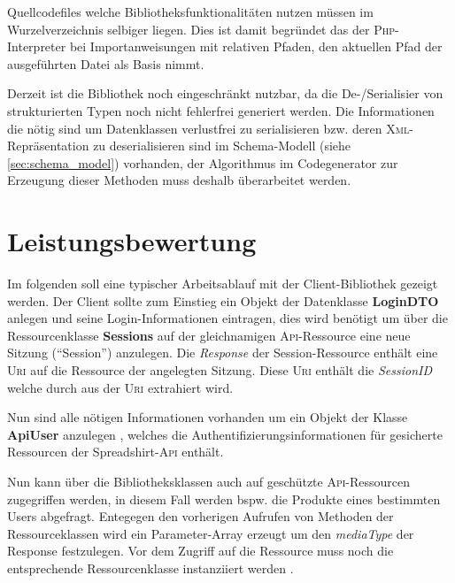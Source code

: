 Quellcodefiles welche Bibliotheksfunktionalitäten nutzen müssen im Wurzelverzeichnis selbiger liegen. Dies ist damit begründet das der \textsc{Php}-Interpreter bei Importanweisungen mit relativen Pfaden, den aktuellen Pfad der ausgeführten Datei als Basis nimmt.

Derzeit ist die Bibliothek noch eingeschränkt nutzbar, da die De-/Serialisier von strukturierten Typen noch nicht fehlerfrei generiert werden. Die Informationen die nötig sind um Datenklassen verlustfrei zu serialisieren bzw. deren \textsc{Xml}-Repräsentation zu deserialisieren sind im Schema-Modell (siehe \cref{sec:schema_model}) vorhanden, der Algorithmus im Codegenerator zur Erzeugung dieser Methoden muss deshalb überarbeitet werden.

\section{Leistungsbewertung}
\label{sec:performance_measurement}

Im folgenden soll eine typischer Arbeitsablauf mit der Client-Bibliothek gezeigt werden. Der Client sollte zum Einstieg ein Objekt der Datenklasse \textbf{LoginDTO} anlegen  und seine Login-Informationen eintragen, dies wird benötigt um über die Ressourcenklasse \textbf{Sessions} auf der gleichnamigen \textsc{Api}-Ressource eine neue Sitzung (\enquote{Session}) anzulegen.
Die \emph{Response} der Session-Ressource enthält eine \textsc{Uri} auf die Ressource der angelegten Sitzung. Diese \textsc{Uri} enthält die \emph{SessionID} welche durch  aus der \textsc{Uri} extrahiert wird.

Nun sind alle nötigen Informationen vorhanden um ein Objekt der Klasse \textbf{ApiUser} anzulegen , welches die Authentifizierungsinformationen für gesicherte Ressourcen der Spreadshirt-\textsc{Api} enthält.

Nun kann über die Bibliotheksklassen auch auf geschützte \textsc{Api}-Ressourcen zugegriffen werden, in diesem Fall werden bspw. die Produkte eines bestimmten Users abgefragt. Entegegen den vorherigen Aufrufen von Methoden der Ressourceklassen wird ein Parameter-Array erzeugt  um den \emph{mediaType} der Response festzulegen.
Vor dem Zugriff auf die Ressource muss noch die entsprechende Ressourcenklasse instanziiert werden .

